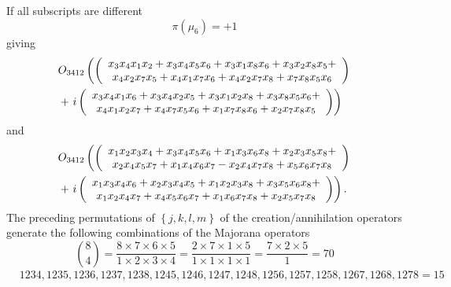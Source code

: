 \documentclass[aps,preprint]{revtex4}%
\begin{document}
\begin{enumerate}
If all subscripts are different
\begin{equation}
\pi\left(  \mu_{6}\right)  =+1
\end{equation}
giving%
\begin{align*}
&  O_{3412}\left(  \left(
\begin{array}
[c]{c}%
\overset{}{x_{3}x_{4}x_{1}x_{2}+x_{3}x_{4}x_{5}x_{6}+x_{3}x_{1}x_{8}%
x_{6}+x_{3}x_{2}x_{8}x_{5}}+\\
x_{4}x_{2}x_{7}x_{5}+x_{4}x_{1}x_{7}x_{6}+x_{4}x_{2}x_{7}x_{8}+x_{7}x_{8}%
x_{5}x_{6}%
\end{array}
\right)  \right.  \\
&  +\left.  i\left(
\begin{array}
[c]{c}%
\overset{}{x_{3}x_{4}x_{1}x_{6}+x_{3}x_{4}x_{2}x_{5}+x_{3}x_{1}x_{2}%
x_{8}+x_{3}x_{8}x_{5}x_{6}}+\\
x_{4}x_{1}x_{2}x_{7}+x_{4}x_{7}x_{5}x_{6}+x_{1}x_{7}x_{8}x_{6}+x_{2}x_{7}%
x_{8}x_{5}%
\end{array}
\right)  \right)
\end{align*}
and
\begin{align*}
&  O_{3412}\left(  \left(
\begin{array}
[c]{c}%
\overset{}{x_{1}x_{2}x_{3}x_{4}+x_{3}x_{4}x_{5}x_{6}+x_{1}x_{3}x_{6}%
x_{8}+x_{2}x_{3}x_{5}x_{8}}+\\
x_{2}x_{4}x_{5}x_{7}+x_{1}x_{4}x_{6}x_{7}-x_{2}x_{4}x_{7}x_{8}+x_{5}x_{6}%
x_{7}x_{8}%
\end{array}
\right)  \right.  \\
&  +\left.  i\left(
\begin{array}
[c]{c}%
\overset{}{x_{1}x_{3}x_{4}x_{6}+x_{2}x_{3}x_{4}x_{5}+x_{1}x_{2}x_{3}%
x_{8}+x_{3}x_{5}x_{6}x_{8}}+\\
x_{1}x_{2}x_{4}x_{7}+x_{4}x_{5}x_{6}x_{7}+x_{1}x_{6}x_{7}x_{8}+x_{2}x_{5}%
x_{7}x_{8}%
\end{array}
\right)  \right)  .
\end{align*}
The preceding permutations of $\left\{  j,k,l,m\right\}  $ of the
creation/annihilation operators generate the following combinations of the
Majorana operators
\begin{equation}
\binom{8}{4}=\frac{8\times7\times6\times5}{1\times2\times3\times4}%
=\frac{2\times7\times1\times5}{1\times1\times1\times1}=\frac{7\times2\times
5}{1}=70
\end{equation}%
\begin{align}
&
1234,1235,1236,1237,1238,1245,1246,1247,1248,1256,1257,1258,1267,1268,1278=15\\

\end{align}
\end{enumerate}
\end{document}
